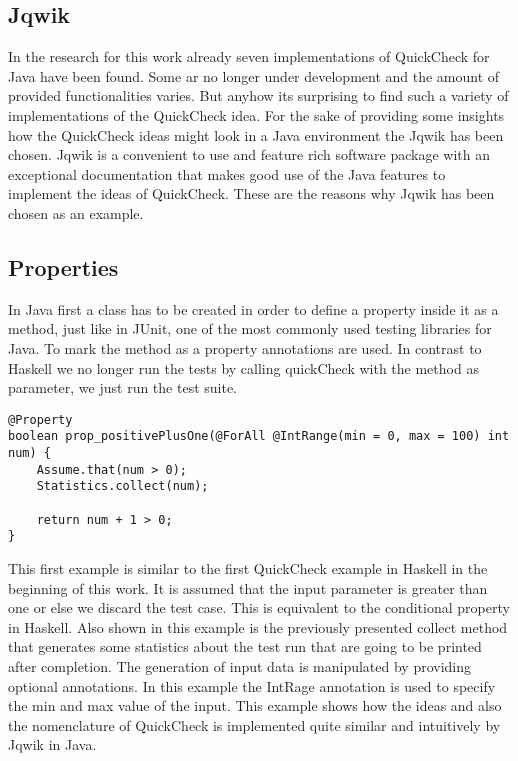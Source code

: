 \documentclass[a4paper, 12pt]{article} %
\begin{document}
\subsection{Jqwik}

In the research for this work already seven implementations of QuickCheck for Java have been found. Some ar no longer under development and the amount of provided functionalities varies. But anyhow its surprising to find such a variety of implementations of the QuickCheck idea. For the sake of providing some insights how the QuickCheck ideas might look in a Java environment the Jqwik\cite{jqwik} has been chosen. Jqwik is a convenient to use and feature rich software package with an exceptional documentation that makes good use of the Java features to implement the ideas of QuickCheck. These are the reasons why Jqwik has been chosen as an example.

\subsection{Properties}

In Java first a class has to be created in order to define a property inside it as a method, just like in JUnit, one of the most commonly used testing libraries for Java. To mark the method as a property annotations are used. In contrast to Haskell we no longer run the tests by calling quickCheck with the method as parameter, we just run the test suite. 

\begin{verbatim}
@Property
boolean prop_positivePlusOne(@ForAll @IntRange(min = 0, max = 100) int num) {
    Assume.that(num > 0);
    Statistics.collect(num);
    
    return num + 1 > 0;
}
\end{verbatim}

This first example is similar to the first QuickCheck example in Haskell in the beginning of this work. It is assumed that the input parameter is greater than one or else we discard the test case. This is equivalent to the conditional property in Haskell. Also shown in this example is the previously presented collect method that generates some statistics about the test run that are going to be printed after completion. The generation of input data is manipulated by providing optional annotations. In this example the IntRage annotation is used to specify the min and max value of the input. This example shows how the ideas and also the nomenclature of QuickCheck is implemented quite similar and intuitively by Jqwik in Java.
\end{document}
